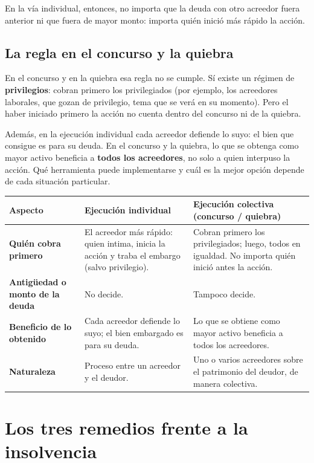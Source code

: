 \documentclass[12pt,oneside]{book}
\begin{document}
En la vía individual, entonces, no importa que la deuda con otro acreedor fuera anterior ni que fuera de mayor monto: importa quién inició más rápido la acción.

\subsection{La regla en el concurso y la quiebra}

En el concurso y en la quiebra esa regla no se cumple. Sí existe un régimen de \textbf{privilegios}: cobran primero los privilegiados (por ejemplo, los acreedores laborales, que gozan de privilegio, tema que se verá en su momento). Pero el haber iniciado primero la acción no cuenta dentro del concurso ni de la quiebra.

Además, en la ejecución individual cada acreedor defiende lo suyo: el bien que consigue es para su deuda. En el concurso y la quiebra, lo que se obtenga como mayor activo beneficia a \textbf{todos los acreedores}, no solo a quien interpuso la acción. Qué herramienta puede implementarse y cuál es la mejor opción depende de cada situación particular.

\begin{table}[H]
\centering
\small
\begin{tabularx}{\textwidth}{
    >{\raggedright\arraybackslash}p{}
    >{\raggedright\arraybackslash}X
    >{\raggedright\arraybackslash}X
}
\toprule
\textbf{Aspecto} & \textbf{Ejecución individual} & \textbf{Ejecución colectiva (concurso / quiebra)} \\
\midrule
\textbf{Quién cobra primero} & El acreedor más rápido: quien intima, inicia la acción y traba el embargo (salvo privilegio). & Cobran primero los privilegiados; luego, todos en igualdad. No importa quién inició antes la acción. \\
\textbf{Antigüedad o monto de la deuda} & No decide. & Tampoco decide. \\
\textbf{Beneficio de lo obtenido} & Cada acreedor defiende lo suyo; el bien embargado es para su deuda. & Lo que se obtiene como mayor activo beneficia a todos los acreedores. \\
\textbf{Naturaleza} & Proceso entre un acreedor y el deudor. & Uno o varios acreedores sobre el patrimonio del deudor, de manera colectiva. \\
\bottomrule
\end{tabularx}
\end{table}

\section{Los tres remedios frente a la insolvencia}
\end{document}
